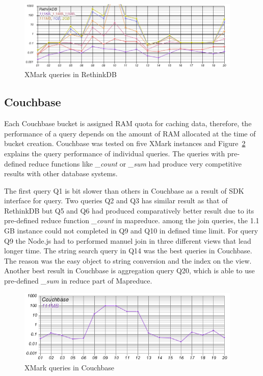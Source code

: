 \begin{figure}
	\centering
	\includegraphics[width=0.95\textwidth]{img/result/rethinkdb/rethinkdb-all}
	\caption{XMark queries in RethinkDB}
	\label{fig:xmark-result-rethinkdb-all}
\end{figure}

\subsection{Couchbase}
Each Couchbase bucket is assigned RAM quota for caching data, therefore, the performance of a query depends on the amount of RAM allocated at the time of bucket creation. Couchbase was tested on five XMark instances and Figure~\ref{fig:xmark-result-cb-all} explains the query performance of individual queries. The queries with pre-defined reduce functions like \textit{\_count} or \textit{\_sum} had produce very competitive results with other database systems.

The first query Q1 is bit slower than others in Couchbase as a result of SDK interface for query. Two queries Q2 and Q3 has similar result as that of RethinkDB  but Q5 and Q6 had produced comparatively better result due to its pre-defined reduce function \textit{\_count} in mapreduce. among the join queries, the 1.1 GB instance could not completed in Q9 and Q10 in defined time limit. For query Q9 the Node.js had to performed manuel join in three different views that lead longer time. 
The string search query in Q14 was the best queries in Couchbase. The reason was the easy object to string conversion and the index on the view. Another best result in Couchbase is aggregation query Q20, which is able to use pre-defined \textit{\_sum} in reduce part of Mapreduce. 

\begin{figure}
	\centering
	\includegraphics[width=0.95\textwidth]{img/result/cb/cb-all}
	\caption{XMark queries in Couchbase}
	\label{fig:xmark-result-cb-all}
\end{figure}

